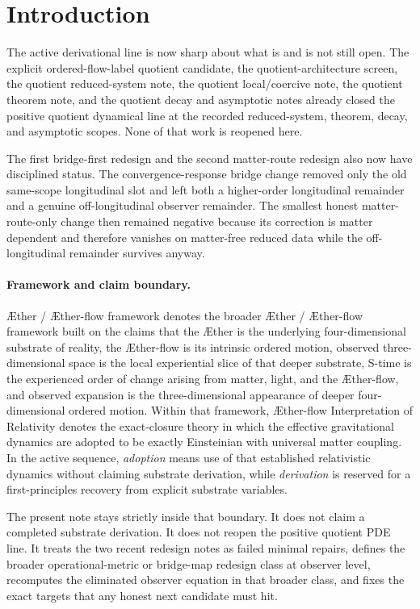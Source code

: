 \documentclass[11pt]{article}
\newcommand{\Aether}{\AE{}ther}
\newcommand{\Aflow}{\AE{}ther-flow}
\newcommand{\TheoryName}{\Aflow{} Interpretation of Relativity}
\newcommand{\TheoryProgram}{\Aether{} / \Aflow{} framework}
\begin{document}
\section{Introduction}

The active derivational line is now sharp about what is and is not still open. The explicit ordered-flow-label quotient candidate, the quotient-architecture screen, the quotient reduced-system note, the quotient local/coercive note, the quotient theorem note, and the quotient decay and asymptotic notes already closed the positive quotient dynamical line at the recorded reduced-system, theorem, decay, and asymptotic scopes. None of that work is reopened here.

The first bridge-first redesign and the second matter-route redesign also now have disciplined status. The convergence-response bridge change removed only the old same-scope longitudinal slot and left both a higher-order longitudinal remainder and a genuine off-longitudinal observer remainder. The smallest honest matter-route-only change then remained negative because its correction is matter dependent and therefore vanishes on matter-free reduced data while the off-longitudinal remainder survives anyway.

\paragraph{Framework and claim boundary.}
\TheoryProgram{} denotes the broader \Aether{} / \Aflow{} framework built on the claims that the \Aether{} is the underlying four-dimensional substrate of reality, the \Aflow{} is its intrinsic ordered motion, observed three-dimensional space is the local experiential slice of that deeper substrate, S-time is the experienced order of change arising from matter, light, and the \Aflow{}, and observed expansion is the three-dimensional appearance of deeper four-dimensional ordered motion. Within that framework, \TheoryName{} denotes the exact-closure theory in which the effective gravitational dynamics are adopted to be exactly Einsteinian with universal matter coupling. In the active sequence, \emph{adoption} means use of that established relativistic dynamics without claiming substrate derivation, while \emph{derivation} is reserved for a first-principles recovery from explicit substrate variables.

The present note stays strictly inside that boundary. It does not claim a completed substrate derivation. It does not reopen the positive quotient PDE line. It treats the two recent redesign notes as failed minimal repairs, defines the broader operational-metric or bridge-map redesign class at observer level, recomputes the eliminated observer equation in that broader class, and fixes the exact targets that any honest next candidate must hit.
\end{document}
